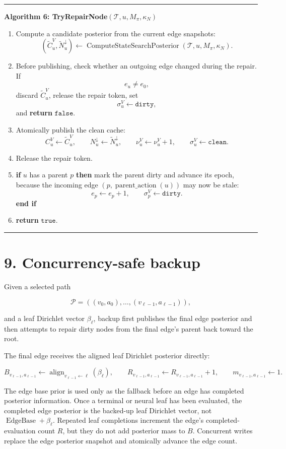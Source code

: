 \documentclass[11pt]{article}
\newcommand{\Tree}{\mathcal{T}}
\newcommand{\Path}{\mathcal{P}}
\newcommand{\Align}{\operatorname{align}}
\newcommand{\EdgeBase}{\operatorname{EdgeBase}}
\newcommand{\ComputeStateSearchPosterior}{\operatorname{ComputeStateSearchPosterior}}
\newenvironment{algorithmblock}[1]
{
  \par\medskip
  \noindent\hrule\par\smallskip
  \noindent\textbf{#1}
  \par\smallskip
}
{
  \par\smallskip\noindent\hrule\par\medskip
}
\newcommand{\Return}{\textbf{return }}
\newcommand{\If}{\textbf{if }}
\newcommand{\Then}{\textbf{ then }}
\newcommand{\EndIf}{\textbf{end if}}
\begin{document}
\begin{algorithmblock}{Algorithm 6: TryRepairNode\((\Tree,u,M_\pi,\kappa_N)\)}
\begin{enumerate}[leftmargin=2em]
  \item Compute a candidate posterior from the current edge snapshots:
  \[
  (\tilde C^V_u,\tilde N^\downarrow_u)
  \gets
  \ComputeStateSearchPosterior(\Tree,u,M_\pi,\kappa_N).
  \]

  \item Before publishing, check whether an outgoing edge changed during the
  repair. If
  \[
  e_u\ne e_0,
  \]
  discard \(\tilde C^V_u\), release the repair token, set
  \[
  \sigma^V_u\gets\texttt{dirty},
  \]
  and \Return \(\texttt{false}\).

  \item Atomically publish the clean cache:
  \[
  C^V_u\gets\tilde C^V_u,
  \qquad
  N^\downarrow_u\gets\tilde N^\downarrow_u,
  \qquad
  \nu^V_u\gets\nu^V_u+1,
  \qquad
  \sigma^V_u\gets\texttt{clean}.
  \]

  \item Release the repair token.

  \item \If \(u\) has a parent \(p\) \Then mark the parent dirty and advance its
  epoch, because the incoming edge \((p,\operatorname{parent\_action}(u))\) may
  now be stale:
  \[
  e_p\gets e_p+1,
  \qquad
  \sigma^V_p\gets\texttt{dirty}.
  \]
  \EndIf

  \item \Return \(\texttt{true}\).
\end{enumerate}

\end{algorithmblock}

\section*{9. Concurrency-safe backup}

Given a selected path

\[
\Path=((v_0,a_0),\ldots,(v_{\ell-1},a_{\ell-1})),
\]

and a leaf Dirichlet vector \(\beta_\ell\), backup first publishes the final
edge posterior and then attempts to repair dirty nodes from the final edge's
parent back toward the root.

The final edge receives the aligned leaf Dirichlet posterior directly:

\[
B_{v_{\ell-1},a_{\ell-1}}
\gets
\Align_{v_{\ell-1}\leftarrow \ell}(\beta_\ell),
\qquad
R_{v_{\ell-1},a_{\ell-1}}
\gets
R_{v_{\ell-1},a_{\ell-1}}+1,
\qquad
m_{v_{\ell-1},a_{\ell-1}}
\gets 1.
\]

The edge base prior is used only as the fallback before an edge has completed
posterior information. Once a terminal or neural leaf has been evaluated, the
completed edge posterior is the backed-up leaf Dirichlet vector, not
\(\EdgeBase+\beta_\ell\). Repeated leaf completions increment the edge's
completed-evaluation count \(R\), but they do not add posterior mass to \(B\).
Concurrent writes replace the edge posterior snapshot and atomically advance the
edge count.
\end{document}
